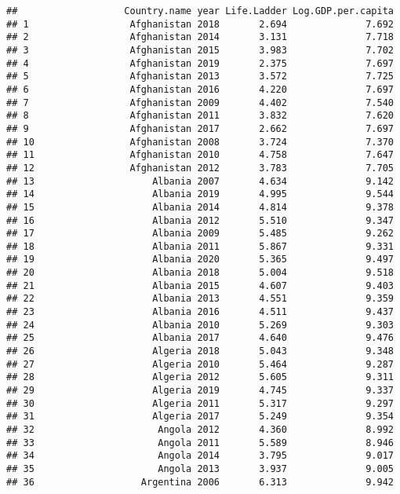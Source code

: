 \documentclass[
]{article}
\begin{document}
\begin{verbatim}
##                   Country.name year Life.Ladder Log.GDP.per.capita
## 1                  Afghanistan 2018       2.694              7.692
## 2                  Afghanistan 2014       3.131              7.718
## 3                  Afghanistan 2015       3.983              7.702
## 4                  Afghanistan 2019       2.375              7.697
## 5                  Afghanistan 2013       3.572              7.725
## 6                  Afghanistan 2016       4.220              7.697
## 7                  Afghanistan 2009       4.402              7.540
## 8                  Afghanistan 2011       3.832              7.620
## 9                  Afghanistan 2017       2.662              7.697
## 10                 Afghanistan 2008       3.724              7.370
## 11                 Afghanistan 2010       4.758              7.647
## 12                 Afghanistan 2012       3.783              7.705
## 13                     Albania 2007       4.634              9.142
## 14                     Albania 2019       4.995              9.544
## 15                     Albania 2014       4.814              9.378
## 16                     Albania 2012       5.510              9.347
## 17                     Albania 2009       5.485              9.262
## 18                     Albania 2011       5.867              9.331
## 19                     Albania 2020       5.365              9.497
## 20                     Albania 2018       5.004              9.518
## 21                     Albania 2015       4.607              9.403
## 22                     Albania 2013       4.551              9.359
## 23                     Albania 2016       4.511              9.437
## 24                     Albania 2010       5.269              9.303
## 25                     Albania 2017       4.640              9.476
## 26                     Algeria 2018       5.043              9.348
## 27                     Algeria 2010       5.464              9.287
## 28                     Algeria 2012       5.605              9.311
## 29                     Algeria 2019       4.745              9.337
## 30                     Algeria 2011       5.317              9.297
## 31                     Algeria 2017       5.249              9.354
## 32                      Angola 2012       4.360              8.992
## 33                      Angola 2011       5.589              8.946
## 34                      Angola 2014       3.795              9.017
## 35                      Angola 2013       3.937              9.005
## 36                   Argentina 2006       6.313              9.942

\end{verbatim}
\end{document}
